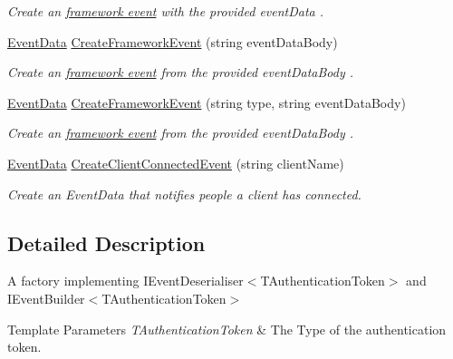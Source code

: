 \begin{DoxyCompactItemize}
\begin{DoxyCompactList}\small\item\em Create an \hyperlink{}{framework event} with the provided {\itshape event\+Data} . \end{DoxyCompactList}\item 
\hyperlink{classCqrs_1_1Events_1_1EventData}{Event\+Data} \hyperlink{classCqrs_1_1EventStore_1_1EventFactory_adbcf9f3c67cfef3fe894e5fb53e8b800_adbcf9f3c67cfef3fe894e5fb53e8b800}{Create\+Framework\+Event} (string event\+Data\+Body)
\begin{DoxyCompactList}\small\item\em Create an \hyperlink{}{framework event} from the provided {\itshape event\+Data\+Body} . \end{DoxyCompactList}\item 
\hyperlink{classCqrs_1_1Events_1_1EventData}{Event\+Data} \hyperlink{classCqrs_1_1EventStore_1_1EventFactory_a9e04e262a8af8f60bdde7b4bf3eafebb_a9e04e262a8af8f60bdde7b4bf3eafebb}{Create\+Framework\+Event} (string type, string event\+Data\+Body)
\begin{DoxyCompactList}\small\item\em Create an \hyperlink{}{framework event} from the provided {\itshape event\+Data\+Body} . \end{DoxyCompactList}\item 
\hyperlink{classCqrs_1_1Events_1_1EventData}{Event\+Data} \hyperlink{classCqrs_1_1EventStore_1_1EventFactory_a237daf998b545d170ab9f30187a0b8e7_a237daf998b545d170ab9f30187a0b8e7}{Create\+Client\+Connected\+Event} (string client\+Name)
\begin{DoxyCompactList}\small\item\em Create an Event\+Data that notifies people a client has connected. \end{DoxyCompactList}\end{DoxyCompactItemize}


\subsection{Detailed Description}
A factory implementing I\+Event\+Deserialiser$<$\+T\+Authentication\+Token$>$ and I\+Event\+Builder$<$\+T\+Authentication\+Token$>$ 


\begin{DoxyTemplParams}{Template Parameters}
{\em T\+Authentication\+Token} & The Type of the authentication token.\\
\hline
\end{DoxyTemplParams}


